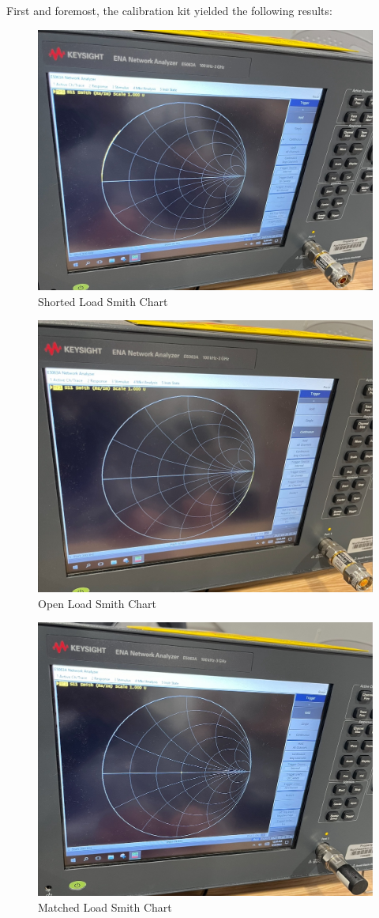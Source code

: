 \documentclass[
	letterpaper, %
	10pt, %
]{CSUniSchoolLabReport}
\begin{document}
First and foremost, the calibration kit yielded the following results:

\begin{figure}[H]
  \centering
  \includegraphics[width=.65\textwidth]{Figures/Lab One/ShortedLoad.png}
  \caption{Shorted Load Smith Chart}
  \label{fig:1}
\end{figure}

\begin{figure}[H]
  \centering
  \includegraphics[width=.65\textwidth]{Figures/Lab One/OpenLoad.png}
  \caption{Open Load Smith Chart}
  \label{fig:2}
\end{figure}

\begin{figure}[H]
  \centering
  \includegraphics[width=.65\textwidth]{Figures/Lab One/MatchedLoad.png}
  \caption{Matched Load Smith Chart}
  \label{fig:3}
\end{figure}
\end{document}
